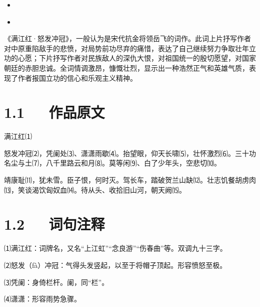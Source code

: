 \documentclass[letterpaper,10pt,english]{sphinxmanual}
\begin{document}
\begin{sphinxShadowBox}
\begin{itemize}
\begin{itemize}
\item {} 
\label{\detokenize{p01_u6563_u6587/_u5cb3_u98de-_u6ee1_u6c5f_u7ea2_xb7_u6012_u53d1_u51b2_u51a0:id16}}{\hyperref[\detokenize{p01_u6563_u6587/_u5cb3_u98de-_u6ee1_u6c5f_u7ea2_xb7_u6012_u53d1_u51b2_u51a0:id8}]{}}

\item {} 
\label{\detokenize{p01_u6563_u6587/_u5cb3_u98de-_u6ee1_u6c5f_u7ea2_xb7_u6012_u53d1_u51b2_u51a0:id17}}{\hyperref[\detokenize{p01_u6563_u6587/_u5cb3_u98de-_u6ee1_u6c5f_u7ea2_xb7_u6012_u53d1_u51b2_u51a0:id9}]{}}

\end{itemize}

\end{itemize}
\end{sphinxShadowBox}

《满江红·怒发冲冠》，一般认为是宋代抗金将领岳飞的词作。此词上片抒写作者对中原重陷敌手的悲愤，对局势前功尽弃的痛惜，表达了自己继续努力争取壮年立功的心愿；下片抒写作者对民族敌人的深仇大恨，对祖国统一的殷切愿望，对国家朝廷的赤胆忠诚。全词情调激昂，慷慨壮烈，显示出一种浩然正气和英雄气质，表现了作者报国立功的信心和乐观主义精神。


\section{1.1   作品原文}
\label{\detokenize{p01_u6563_u6587/_u5cb3_u98de-_u6ee1_u6c5f_u7ea2_xb7_u6012_u53d1_u51b2_u51a0:id3}}
满江红⑴

怒发冲冠⑵，凭阑处⑶、潇潇雨歇⑷。抬望眼，仰天长啸⑸，壮怀激烈⑹。三十功名尘与土⑺，八千里路云和月⑻。莫等闲⑼、白了少年头，空悲切⑽。

靖康耻⑾，犹未雪。臣子恨，何时灭。驾长车，踏破贺兰山缺⑿。壮志饥餐胡虏肉⒀，笑谈渴饮匈奴血⒁。待从头、收拾旧山河，朝天阙⒂。


\section{1.2   词句注释}
\label{\detokenize{p01_u6563_u6587/_u5cb3_u98de-_u6ee1_u6c5f_u7ea2_xb7_u6012_u53d1_u51b2_u51a0:id4}}
⑴满江红：词牌名，又名“上江虹”“念良游”“伤春曲”等。双调九十三字。

⑵怒发（fà）冲冠：气得头发竖起，以至于将帽子顶起。形容愤怒至极。

⑶凭阑：身倚栏杆。阑，同“栏”。

⑷潇潇：形容雨势急骤。
\end{document}
